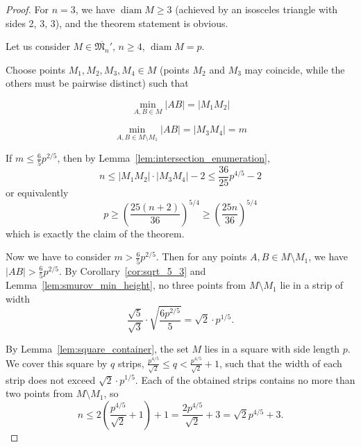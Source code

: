 \documentclass[a4paper,14pt]{article} %
\theoremstyle{plain}
\theoremstyle{definition}
\begin{document}
\begin{proof}
	For $n = 3$, we have $\operatorname{diam} M \geq 3$ (achieved by an isosceles triangle with sides 2, 3, 3), and the theorem statement is obvious.

	Let us consider $M \in \overline{\mathfrak{M}_n}'$, $n \geq 4$, $\operatorname{diam} M = p$.

	Choose points $M_1, M_2, M_3, M_4 \in M$ (points $M_2$ and $M_3$ may coincide, while the others must be pairwise distinct) such that

	\begin{equation*}
		\min_{A,B \in M} |AB| = |M_1 M_2|
	\end{equation*}

	\begin{equation*}
		\min_{A,B \in M \setminus {M_1}} |AB| = |M_3 M_4| = m
	\end{equation*}

	If $m \leq \frac{6}{5}p^{2/5}$, then by Lemma~\ref{lem:intersection_enumeration},
	\begin{equation*}
		n \leq |M_1 M_2| \cdot |M_3 M_4| - 2 \leq \frac{36}{25}p^{4/5} - 2
	\end{equation*}
	or equivalently
	\begin{equation}
		p \geq \left(\frac{25(n+2)}{36}\right)^{5/4} \geq \left(\frac{25n}{36}\right)^{5/4}
	\end{equation}
	which is exactly the claim of the theorem.

	Now we have to consider $m > \frac{6}{5}p^{2/5}$.
	Then for any points $A, B \in M \setminus {M_1}$, we have $|AB| > \frac{6}{5}p^{2/5}$.
	By Corollary~\ref{cor:sqrt_5_3} and Lemma~\ref{lem:smurov_min_height},
	no three points from $M \setminus {M_1}$ lie in a strip of width
	\begin{equation}
		\frac{\sqrt{5}}{\sqrt{3}} \cdot \sqrt{\frac{6p^{2/5}}{5}} = \sqrt{2} \cdot p^{1/5}
		.
	\end{equation}

	By Lemma~\ref{lem:square_container}, the set $M$ lies in a square with side length $p$. We cover this square by $q$ strips, $\frac{p^{4/5}}{\sqrt{2}} \leq q < \frac{p^{4/5}}{\sqrt{2}} + 1$, such that the width of each strip does not exceed $\sqrt{2} \cdot p^{1/5}$.
	Each of the obtained strips contains no more than two points from $M \setminus {M_1}$, so
	\begin{equation}
		\label{eq: 46}
		n \leq 2 \left( \frac{p^{4/5}}{\sqrt{2}} + 1\right) + 1=\frac{2p^{4/5}}{\sqrt{2}} +3 = \sqrt{2}p^{4/5}+3
		.
	\end{equation}


\end{proof}
\end{document}
